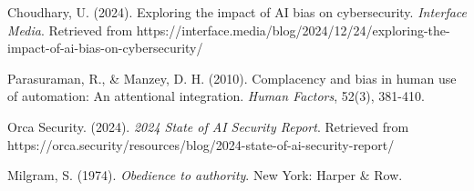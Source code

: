 \documentclass[11pt,a4paper]{article}
\begin{document}
\begin{thebibliography}{99}
Choudhary, U. (2024). Exploring the impact of AI bias on cybersecurity. \textit{Interface Media}. Retrieved from https://interface.media/blog/2024/12/24/exploring-the-impact-of-ai-bias-on-cybersecurity/

Parasuraman, R., \& Manzey, D. H. (2010). Complacency and bias in human use of automation: An attentional integration. \textit{Human Factors}, 52(3), 381-410.

Orca Security. (2024). \textit{2024 State of AI Security Report}. Retrieved from https://orca.security/resources/blog/2024-state-of-ai-security-report/

Milgram, S. (1974). \textit{Obedience to authority}. New York: Harper \& Row.

\end{thebibliography}
\end{document}

